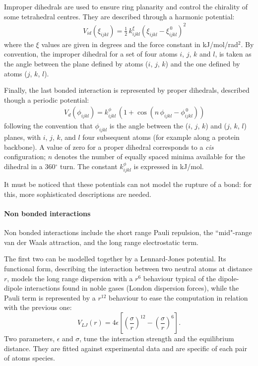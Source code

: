 Improper dihedrals are used to ensure ring planarity and control the chirality of some tetrahedral centres. They are described through a harmonic potential:
\begin{eqnarray}
&& V_{id} (\xi_{ijkl}) = \frac{1}{2}\,k_{ijkl}^\xi \left( \xi_{ijkl} - \xi_{ijkl}^{\, 0} \right)^2
\end{eqnarray}
where the $\xi$ values are given in degrees and the force constant in kJ/mol/rad$^2$. By convention, the improper dihedral for a set of four atoms $i$, $j$, $k$ and $l$, is taken as the angle between the plane defined by atoms ($i$, $j$, $k$) and the one defined by atoms ($j$, $k$, $l$).

Finally, the last bonded interaction is represented by proper dihedrals, described though a periodic potential:
\begin{eqnarray}
&& V_d(\phi_{ijkl}) = k_{ijkl}^\phi\,\left( 1 + \cos\left( n \, \phi_{ijkl} - \phi_{ijkl}^{\, 0} \right) \right)
\end{eqnarray}
following the convention that $\phi_{ijkl}$ is the angle between the ($i$, $j$, $k$) and ($j$, $k$, $l$) planes, with $i$, $j$, $k$, and $l$ four subsequent atoms (for example along a protein backbone). A value of zero for a proper dihedral corresponds to a \textit{cis} configuration; $n$ denotes the number of equally spaced minima available for the dihedral in a 360$^\circ$ turn. The constant $k_{ijkl}^\phi$ is expressed in kJ/mol.

It must be noticed that these potentials can not model the rupture of a bond: for this, more sophisticated descriptions are needed.


\paragraph{Non bonded interactions}
Non bonded interactions include the short range Pauli repulsion, the ``mid"-range van der Waals attraction, and the long range electrostatic term.

The first two can be modelled together by a Lennard-Jones potential. Its functional form, describing the interaction between two neutral atoms at distance $r$, models the long range dispersion with a $r^6$ behaviour typical of the dipole-dipole interactions found in noble gases (London dispersion forces), while the Pauli term is represented by a $r^{12}$ behaviour to ease the computation in relation with the previous one:
\begin{equation}
V_{LJ}(r) = 4 \epsilon \left[ \left( \frac{\sigma}{r} \right)^{12} - \left( \frac{\sigma}{r} \right)^6 \right].
\end{equation}
Two parameters, $\epsilon$ and $\sigma$, tune the interaction strength and the equilibrium distance. They are fitted against experimental data and are specific of each pair of atoms species.

